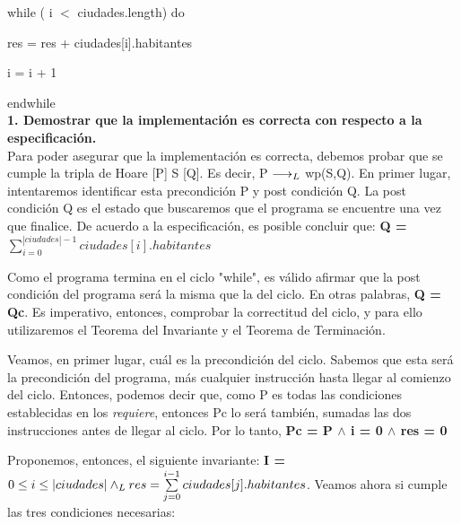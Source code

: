 \documentclass[10pt,a4paper]{article}
\begin{document}
    while ( i $<$ ciudades.length) do
    
    \hspace{0.7cm}res = res + ciudades[i].habitantes
    
    \hspace{0.7cm}i = i + 1
    
    endwhile\\

\newpage
\textbf{1. Demostrar que la implementación es correcta con respecto a la especificación.}\\

Para poder asegurar que la implementación es correcta, debemos probar que se cumple la tripla de Hoare [P] S [Q]. Es decir, P $\longrightarrow _L$ wp(S,Q). En primer lugar, intentaremos identificar esta precondición P y post condición Q.
La post condición Q es el estado que buscaremos que el programa se encuentre una vez que finalice. De acuerdo a la especificación, es posible concluir que:
\textbf{{Q = ${\sum\limits_{i=0}^{|ciudades| - 1}ciudades[i].habitantes}$}}

Como el programa termina en el ciclo "while", es válido afirmar que la post condición del programa será la misma que la del ciclo. En otras palabras, \textbf{Q = Qc}. Es imperativo, entonces, comprobar la correctitud del ciclo, y para ello utilizaremos el Teorema del Invariante y el Teorema de Terminación.

Veamos, en primer lugar, cuál es la precondición del ciclo. Sabemos que esta será la precondición del programa, más cualquier instrucción hasta llegar al comienzo del ciclo. Entonces, podemos decir que, como P es todas las condiciones establecidas en los \textit{requiere}, entonces Pc lo será también, sumadas las dos instrucciones antes de llegar al ciclo. Por lo tanto, \textbf{Pc = P $\wedge$ i = 0 $\wedge$ res = 0}

Proponemos, entonces, el siguiente invariante: \textbf{I = $0 \leq i \leq |ciudades| \land _L res = \sum\limits_{j=0}^{i - 1}ciudades[j].habitantes$}. Veamos ahora si cumple las tres condiciones necesarias: 
\end{document}

